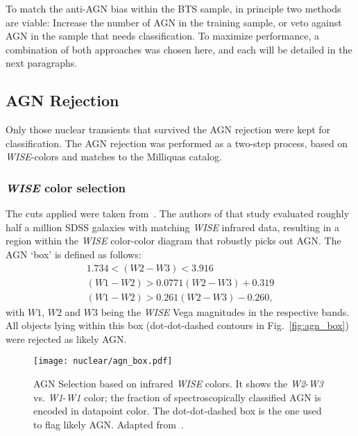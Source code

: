 To match the anti-AGN bias within the BTS sample, in principle two methods are viable: Increase the number of AGN in the training sample, or veto against AGN in the sample that needs classification. To maximize performance, a combination of both approaches was chosen here, and each will be detailed in the next paragraphs.

\subsection{AGN Rejection}\label{agn_rejection}
Only those nuclear transients that survived the AGN rejection were kept for classification. The AGN rejection was performed as a two-step process, based on \textit{WISE}-colors and matches to the Milliquas catalog.

\subsubsection{\textit{WISE} color selection}\label{wise_color_cut}
The cuts applied were taken from~\cite{Hviding2022}. The authors of that study evaluated roughly half a million SDSS galaxies with matching \textit{WISE} infrared data, resulting in a region within the \textit{WISE} color-color diagram that robustly picks out AGN. The AGN `box' is defined as follows:
\begin{subequations}
  \begin{eqnarray}
    1.734 < (\textit{W2}-\textit{W3}) < 3.916 \\
    (\textit{W1}-\textit{W2}) > 0.0771 (\textit{W2}-\textit{W3}) + 0.319 \\
    (\textit{W1}-\textit{W2}) > 0.261 (\textit{W2}-\textit{W3}) - 0.260,
  \end{eqnarray}
\end{subequations}
with $W1$, $W2$ and $W3$ being the \textit{WISE} Vega magnitudes in the respective bands. All objects lying within this box (dot-dot-dashed contours in Fig.~\ref{fig:agn_box}) were rejected as likely AGN.

\begin{figure}[htpb]
  \texttt{[image: nuclear/agn\_box.pdf]}
  \caption[Infrared AGN selection]{AGN Selection based on infrared \textit{WISE} colors. It shows the \textit{W2}-\textit{W3} vs. \textit{W1}-\textit{W1} color; the fraction of spectroscopically classified AGN is encoded in datapoint color. The dot-dot-dashed box is the one used to flag likely AGN. Adapted from~\cite{Hviding2022}.}
\end{figure}

